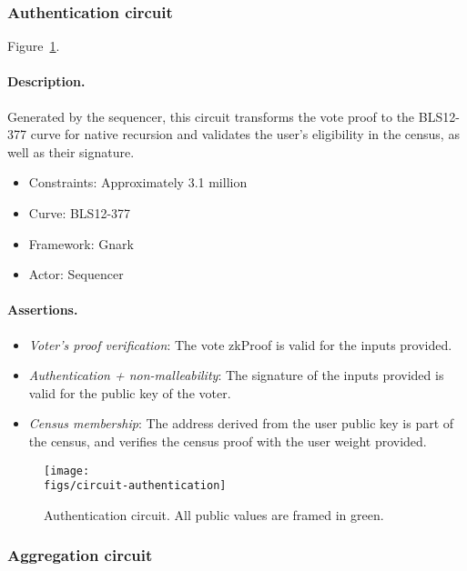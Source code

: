 \subsubsection{Authentication circuit}

Figure~\ref{fig:circuit-authentication}.

\paragraph{Description.} Generated by the sequencer, this circuit transforms the vote proof to the BLS12-377 curve for native recursion and validates the user's eligibility in the census, as well as their signature.

\begin{itemize}
	\item Constraints: Approximately 3.1 million
	\item Curve: BLS12-377
	\item Framework: Gnark
	\item Actor: Sequencer
\end{itemize}

\paragraph{Assertions.}

\begin{itemize}
	\item \emph{Voter's proof verification}: The vote zkProof is valid for the inputs provided.
	\item \emph{Authentication + non-malleability}: The signature of the inputs provided is valid for the public key of the voter.
	\item \emph{Census membership}: The address derived from the user public key is part of the census, and verifies the census proof with the user weight provided.
\end{itemize}

\begin{figure}[h]
	\centerline{\texttt{[image: \\figs/circuit-authentication]}}
	\caption{Authentication circuit. All public values are framed in green.}
	\label{fig:circuit-authentication}
\end{figure}

\subsubsection{Aggregation circuit}

